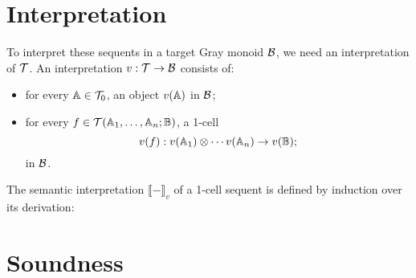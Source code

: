 \documentclass{robinthesisdraft}
\begin{document}
\section{Interpretation}
To interpret these sequents in a target Gray monoid $\mathcal{B}$, we need
an interpretation of ${\mathcal{T}}$. An interpretation
$v:{\mathcal{T}}\to\mathcal{B}$ consists of:
\begin{itemize}
	\item for every $\mathbb{A}\in{\mathcal{T}}_{0}$, an object $v(\mathbb{A})$ in $\mathcal{B}$;
	\item for every $f\in{\mathcal{T}}(\mathbb{A}_{1},\dots,\mathbb{A}_{n};\mathbb{B})$, a 1-cell
	\[
		v(f): v(\A_{1})\tn\cdots v(\A_{n})\to v(\CB);
	\]
	in $\mathcal{B}$.
\end{itemize}
%
The semantic interpretation $\llbracket-\rrbracket_{v}$ of a 1-cell
sequent is defined by induction over its derivation:

\section{Soundness}


\end{document}
